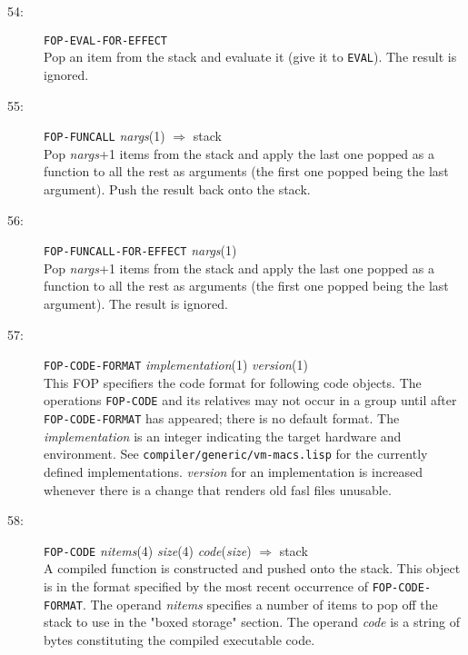 \begin{description}
\item[54:] \hspace{2em} {\tt FOP-EVAL-FOR-EFFECT} \\
Pop an item from the stack and evaluate it (give it to {\tt EVAL}).
The result is ignored.

\item[55:] \hspace{2em} {\tt FOP-FUNCALL} \hspace{2em} {\it nargs}(1) \hspace{2em} $\Rightarrow$ \hspace{2em} stack \\
Pop {\it nargs}+1 items from the stack and apply the last one popped
as a function to
all the rest as arguments (the first one popped being the last argument).
Push the result back onto the stack.

\item[56:] \hspace{2em} {\tt FOP-FUNCALL-FOR-EFFECT} \hspace{2em} {\it nargs}(1) \\
Pop {\it nargs}+1 items from the stack and apply the last one popped
as a function to
all the rest as arguments (the first one popped being the last argument).
The result is ignored.

\item[57:] \hspace{2em} {\tt FOP-CODE-FORMAT} \hspace{2em} {\it implementation}(1)
\hspace{2em} {\it version}(1) \\
This FOP specifiers the code format for following code objects.  The operations
{\tt FOP-CODE} and its relatives may not occur in a group until after {\tt
FOP-CODE-FORMAT} has appeared; there is no default format.  The {\it
implementation} is an integer indicating the target hardware and environment.
See {\tt compiler/generic/vm-macs.lisp} for the currently defined
implementations.  {\it version} for an implementation is increased whenever
there is a change that renders old fasl files unusable.

\item[58:] \hspace{2em} {\tt FOP-CODE} \hspace{2em} {\it nitems}(4) \hspace{2em} {\it size}(4) \hspace{2em}
{\it code}({\it size}) \hspace{2em} $\Rightarrow$ \hspace{2em} stack \\
A compiled function is constructed and pushed onto the stack.
This object is in the format specified by the most recent
occurrence of {\tt FOP-CODE-FORMAT}.
The operand {\it nitems} specifies a number of items to pop off
the stack to use in the "boxed storage" section.  The operand {\it code}
is a string of bytes constituting the compiled executable code.


\end{description}

